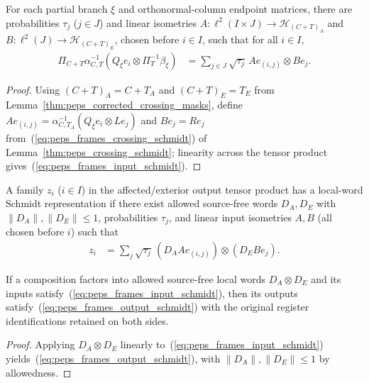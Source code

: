 \begin{lemma}
    \label{thm:peps_actual_schmidt_input_frames}
    \leanok
    For each partial branch $\xi$ and orthonormal-column endpoint matrices,
    there are probabilities $\tau_j$ ($j\in J$) and linear isometries
    $A\colon\ell^2(I\times J)\to\mathcal H_{(C+T)_A}$ and $B\colon\ell^2(J)\to\mathcal H_{(C+T)_E}$, chosen before $i\in I$, such that for all $i\in I$,
    \begin{align}
        \Pi_{C+T}\alpha_{C,T}^{-1}(Q_\xi e_i\otimes\Pi_T^{-1}\beta_\xi)
         & = \sum_{j\in J}\sqrt{\tau_j}\,Ae_{(i,j)}\otimes Be_j.
        \label{eq:peps_frames_input_schmidt}
    \end{align}
\end{lemma}
\begin{proof}
    \leanok
    Using $(C+T)_A=C+T_A$ and $(C+T)_E=T_E$ from Lemma~\ref{thm:peps_corrected_crossing_masks}, define $Ae_{(i,j)}=\alpha_{C,T_A}^{-1}(Q_\xi e_i\otimes Le_j)$ and $Be_j=Re_j$ from~(\ref{eq:peps_frames_crossing_schmidt}) of Lemma~\ref{thm:peps_crossing_schmidt}; linearity across the tensor product gives~(\ref{eq:peps_frames_input_schmidt}).
\end{proof}

\begin{definition}
    \label{def:peps_schmidt_local_output}
    \leanok
    A family $z_i$ ($i\in I$) in the affected/exterior output tensor product has a
    local-word Schmidt representation if there exist allowed source-free
    words $D_A,D_E$ with $\|D_A\|,\|D_E\|\le1$, probabilities
    $\tau_j$, and linear input isometries $A,B$ (all chosen before $i$) such that
    \begin{align}
        z_i & = \sum_j\sqrt{\tau_j}\,(D_AAe_{(i,j)})\otimes(D_EBe_j).
        \label{eq:peps_frames_output_schmidt}
    \end{align}
\end{definition}

\begin{lemma}
    \label{thm:peps_local_schmidt_output}
    \leanok
    If a composition factors into allowed source-free local words $D_A\otimes D_E$ and
    its inputs satisfy~(\ref{eq:peps_frames_input_schmidt}), then its outputs
    satisfy~(\ref{eq:peps_frames_output_schmidt}) with the original register
    identifications retained on both sides.
\end{lemma}
\begin{proof}
    \leanok
    Applying $D_A\otimes D_E$ linearly to~(\ref{eq:peps_frames_input_schmidt}) yields~(\ref{eq:peps_frames_output_schmidt}), with $\|D_A\|,\|D_E\|\le1$ by allowedness.
\end{proof}

